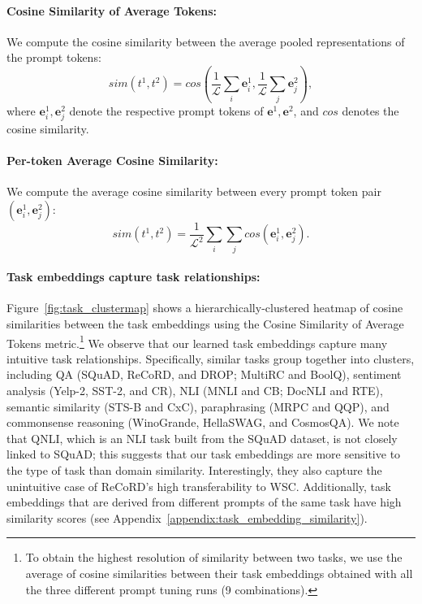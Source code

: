 \paragraph{{\small \sc \textbf{Cosine Similarity of Average Tokens}}:} We compute the cosine similarity between the average pooled representations of the prompt tokens: 
\[sim(t^1, t^2) = cos(\dfrac{1}{\bm{\mathcal{L}}}\sum_{i} \bm{e}_i^{1}, \dfrac{1}{\bm{\mathcal{L}}}\sum_{j} \bm{e}_j^{2}),\] where $\bm{e}_i^{1}, \bm{e}_j^{2}$ denote the respective prompt tokens of $\bm{e}^{1}, \bm{e}^{2}$, and $cos$ denotes the cosine similarity.
\paragraph{{\small \sc \textbf{Per-token Average Cosine Similarity}}:} We compute the average cosine similarity between every prompt token pair $(\bm{e}_i^{1}, \bm{e}_j^{2})$:
\[sim(t^1, t^2) = \dfrac{1}{\bm{\mathcal{L}}^2} \sum_{i} \sum_{j}  cos(\bm{e}_i^{1}, \bm{e}_j^{2}).\]
\paragraph{Task embeddings capture task relationships:} Figure~\ref{fig:task_clustermap} shows a hierarchically-clustered heatmap of cosine similarities between the task embeddings using the {\small \sc Cosine Similarity of Average Tokens} metric.\footnote{To obtain the highest resolution of similarity between two tasks, we use the average of cosine similarities between their task embeddings obtained with all the three different prompt tuning runs (9 combinations).} We observe that our learned task embeddings capture many intuitive task relationships. Specifically, similar tasks group together into clusters, including {\small \sc QA} ({\small \sc SQuAD}, {\small \sc ReCoRD}, and {\small \sc DROP}; {\small \sc MultiRC} and {\small \sc BoolQ}), sentiment analysis ({\small \sc \mbox{Yelp-2}}, {\small \sc \mbox{SST-2}}, and {\small \sc CR}), {\small \sc NLI} ({\small \sc MNLI} and {\small \sc CB}; {\small \sc DocNLI} and {\small \sc RTE}), semantic similarity ({\small \sc \mbox{STS-B}} and {\small \sc CxC}), paraphrasing ({\small \sc MRPC} and {\small \sc QQP}), and commonsense reasoning ({\small \sc WinoGrande}, {\small \sc HellaSWAG}, and {\small \sc CosmosQA}). We note that {\small \sc QNLI}, which is an {\small \sc NLI} task built from the {\small \sc SQuAD} dataset, is not closely linked to {\small \sc SQuAD}; this suggests that our task embeddings are more sensitive to the type of task than domain similarity. Interestingly, they also capture the unintuitive case of {\small \sc ReCoRD}'s high transferability to {\small \sc WSC}. Additionally, task embeddings that are derived from different prompts of the same task have high similarity scores (see Appendix~\ref{appendix:task_embedding_similarity}).

